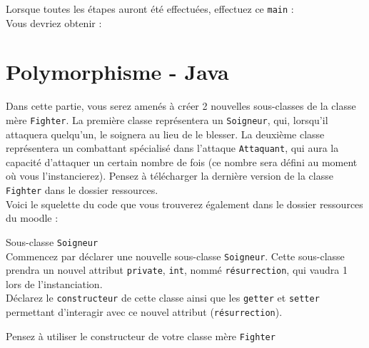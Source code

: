 Lorsque toutes les étapes auront été effectuées, effectuez ce \lstinline{main} : \\




Vous devriez obtenir : \\




\section{Polymorphisme - Java}

Dans cette partie, vous serez amenés à créer 2 nouvelles sous-classes de la classe mère \lstinline{Fighter}. La première classe représentera un \lstinline{Soigneur}, qui, lorsqu'il attaquera quelqu'un, le soignera au lieu de le blesser. La deuxième classe représentera un combattant spécialisé dans l'attaque \lstinline{Attaquant}, qui aura la capacité d'attaquer un certain nombre de fois (ce nombre sera défini au moment où vous l'instancierez). Pensez à télécharger la dernière version de la classe \lstinline{Fighter} dans le dossier ressources.\\

Voici le squelette du code que vous trouverez également dans le dossier ressources du moodle : \\



\begin{Exercice}[5 minutes] Sous-classe \lstinline{Soigneur} \\

Commencez par déclarer une nouvelle sous-classe \lstinline{Soigneur}. Cette sous-classe prendra un nouvel attribut \lstinline{private}, \lstinline{int}, nommé \lstinline{résurrection}, qui vaudra 1 lors de l'instanciation. \\

Déclarez le \lstinline{constructeur} de cette classe ainsi que les \lstinline{getter} et \lstinline{setter} permettant d'interagir avec ce nouvel attribut (\lstinline{résurrection}). \\

\begin{conseil}
Pensez à utiliser le constructeur de votre classe mère \lstinline{Fighter}
\end{conseil}

\begin{solution}
	
\end{solution}

\end{Exercice}

